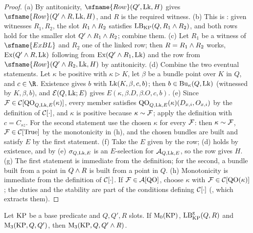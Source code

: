 \begin{proof}
(a) By antitonicity, $\sfname{Row}(Q',\stageULk,H)$ gives $\sfname{Row}(Q'\stageUand R,\stageULk,H)$, and $R$ is the required
witness. (b) This is : given witnesses $R_1,R_2$, the slot $R_1\mathbin{\wedge} R_2$ satisfies
$\mathrm{LB}_{\mathrm{KP}}(Q,R_1\mathbin{\wedge} R_2)$, and both rows hold for the smaller slot $Q'\mathbin{\wedge} R_1\mathbin{\wedge} R_2$; combine them.
(c) Let $R_1$ be a witness of $\sfname{ExBL}$ and $R_2$ one of the linked row; then $R=R_1\mathbin{\wedge} R_2$ works,
$\mathrm{Ex}(Q'\mathbin{\wedge} R,\mathrm{Lk})$ following from $\mathrm{Ex}(Q'\mathbin{\wedge} R_1,\mathrm{Lk})$ and the row from
$\sfname{Row}(Q'\stageUand R_2,\stageULk,H)$ by antitonicity. (d) Combine the two eventual statements. Let $\kappa$ be positive
with $\kappa\triangleright K$, let $\beta$ be a bundle point over $K$ in $Q$, and $c\in\R$. Existence gives $b$ with
$\mathrm{Lk}(K,\beta,c,b)$; then $b\in\mathrm{Bu}_\kappa(Q,\mathrm{Lk})$ (witnessed by $K,\beta,b$), and $\mathcal{E}(Q,\mathrm{Lk};E)$ gives
$E(\kappa,\beta.D,\beta.O,c,b)$. (e) Since $\mathcal{F}\in\mathcal{C}[\mathrm{QO}_{Q,\mathrm{Lk},E}(\kappa)]$, every member satisfies
$\mathrm{QO}_{Q,\mathrm{Lk},E}(\kappa)(D_{x,i},O_{x,i})$ by the definition of $\mathcal{C}[\cdot]$, and $\kappa$ is positive because
$\kappa\sim\mathcal{F}$; apply the definition with $c=C_{sz}$. For the second statement use the chosen $\kappa$ for every
$\mathcal{F}$: then $\kappa\sim\mathcal{F}$, $\mathcal{F}\in\mathcal{C}[\mathrm{True}]$ by the monotonicity in (h), and the chosen bundles
are built and satisfy $E$ by the first statement. (f) Take the $E$ given by the row; (d) holds by existence, and by (e)
$\sigma_{Q,\mathrm{Lk},E}$ is an $E$-selection for $\mathcal{A}_{Q,\mathrm{Lk},E}$, so the row gives $H$. (g) The first statement is
immediate from the definition; for the second, a bundle built from a point in $Q\mathbin{\wedge} R$ is built from a point in
$Q$. (h) Monotonicity is immediate from the definition of $\mathcal{C}[\cdot]$. If $\mathcal{F}\in\mathcal{A}[\mathrm{QO}]$, choose $\kappa$
with $\mathcal{F}\in\mathcal{C}[\mathrm{QO}(\kappa)]$; the duties and the stability are part of the conditions defining
$\mathcal{C}[\cdot]$ (, which extracts them).
\end{proof}

\begin{lemma}\label{pf:stageU:secondg}
Let $\mathrm{KP}$ be a base predicate and $Q,Q',R$ slots. If $\mathrm{M}_0(\mathrm{KP})$, $\mathrm{LB}^{\mathrm g}_{\mathrm{KP}}(Q,R)$
and $\mathrm{M}_3(\mathrm{KP},Q,Q')$, then $\mathrm{M}_3(\mathrm{KP},Q,Q'\mathbin{\wedge} R)$.
\end{lemma}

